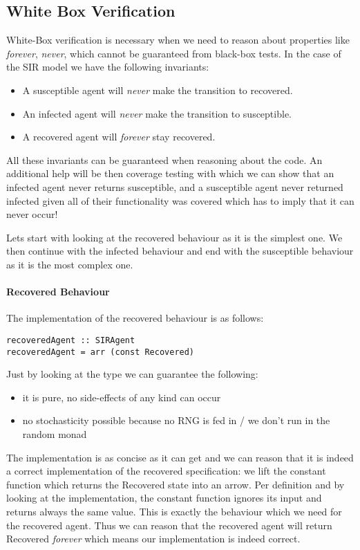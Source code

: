 \subsection{White Box Verification}
White-Box verification is necessary when we need to reason about properties like \textit{forever}, \textit{never}, which cannot be guaranteed from black-box tests. In the case of the SIR model we have the following invariants: 
\begin{itemize}
	\item A susceptible agent will \textit{never} make the transition to recovered.
	\item An infected agent will \textit{never} make the transition to susceptible.
	\item A recovered agent will \textit{forever} stay recovered.
\end{itemize}

All these invariants can be guaranteed when reasoning about the code. An additional help will be then coverage testing with which we can show that an infected agent never returns susceptible, and a susceptible agent never returned infected given all of their functionality was covered which has to imply that it can never occur!

Lets start with looking at the recovered behaviour as it is the simplest one. We then continue with the infected behaviour and end with the susceptible behaviour as it is the most complex one.

\paragraph{Recovered Behaviour}
The implementation of the recovered behaviour is as follows:

\begin{verbatim}
recoveredAgent :: SIRAgent
recoveredAgent = arr (const Recovered)
\end{verbatim}

Just by looking at the type we can guarantee the following:
\begin{itemize}
	\item it is pure, no side-effects of any kind can occur
	\item no stochasticity possible because no RNG is fed in / we don't run in the random monad
\end{itemize}

The implementation is as concise as it can get and we can reason that it is indeed a correct implementation of the recovered specification: we lift the constant function which returns the Recovered state into an arrow. Per definition and by looking at the implementation, the constant function ignores its input and returns always the same value. This is exactly the behaviour which we need for the recovered agent. Thus we can reason that the recovered agent will return Recovered \textit{forever} which means our implementation is indeed correct.

